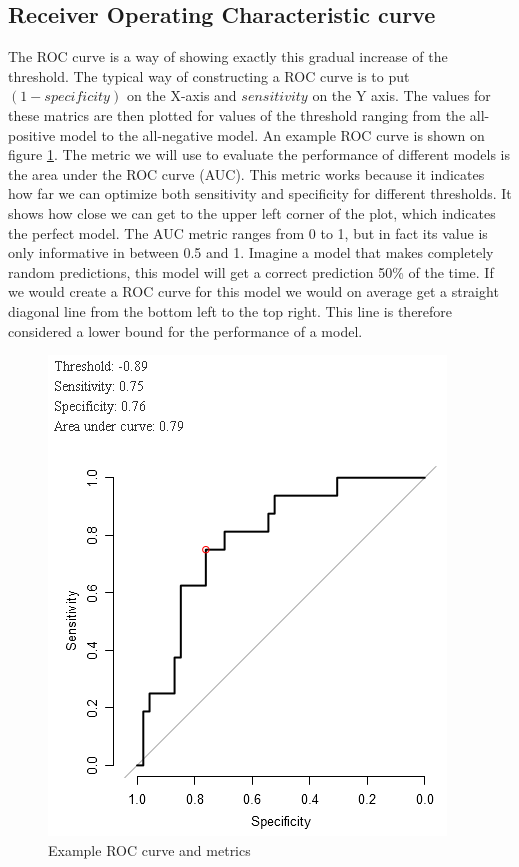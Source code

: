 \subsection{Receiver Operating Characteristic curve}
The ROC curve is a way of showing exactly this gradual increase of the threshold. The typical way of constructing a ROC curve is to put $(1-specificity)$ on the X-axis and $sensitivity$ on the Y axis. The values for these matrics are then plotted for values of the threshold ranging from the all-positive model to the all-negative model. An example ROC curve is shown on figure \ref{fig:evaluation-roc}. The metric we will use to evaluate the performance of different models is the area under the ROC curve (AUC). This metric works because it indicates how far we can optimize both sensitivity and specificity for different thresholds. It shows how close we can get to the upper left corner of the plot, which indicates the perfect model. The AUC metric ranges from 0 to 1, but in fact its value is only informative in between 0.5 and 1. Imagine a model that makes completely random predictions, this model will get a correct prediction 50\% of the time. If we would create a ROC curve for this model we would on average get a straight diagonal line from the bottom left to the top right. This line is therefore considered a lower bound for the performance of a model.
\begin{figure}
	\centering
	\includegraphics[scale=.9]{images/roc_curve}
	\caption{Example ROC curve and metrics}
	\label{fig:evaluation-roc}
\end{figure}
